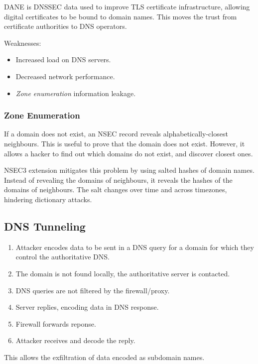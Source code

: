 \documentclass[11pt]{article}
\begin{document}
DANE is DNSSEC data used to improve TLS certificate infrastructure, allowing digital certificates to be bound to domain names.
This moves the trust from certificate authorities to DNS operators.

Weaknesses:
\begin{itemize}
  \item Increased load on DNS servers.
  \item Decreased network performance.
  \item \textit{Zone enumeration} information leakage.
\end{itemize}

\subsubsection{Zone Enumeration}
If a domain does not exist, an NSEC record reveals alphabetically-closest neighbours.
This is useful to prove that the domain does not exist.
However, it allows a hacker to find out which domains do not exist, and discover closest ones.

NSEC3 extension mitigates this problem by using salted hashes of domain names.
Instead of revealing the domains of neighbours, it reveals the hashes of the domains of neighbours.
The salt changes over time and across timezones, hindering dictionary attacks.

\subsection{DNS Tunneling}
\begin{enumerate}
  \item Attacker encodes data to be sent in a DNS query for a domain for which they control the authoritative DNS.
  \item The domain is not found locally, the authoritative server is contacted.
  \item DNS queries are not filtered by the firewall/proxy.
  \item Server replies, encoding data in DNS response.
  \item Firewall forwards reponse.
  \item Attacker receives and decode the reply.
\end{enumerate}

This allows the exfiltration of data encoded as subdomain names.
\end{document}

